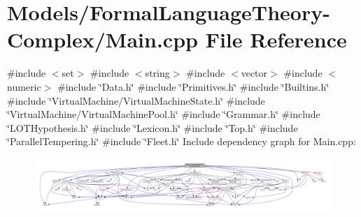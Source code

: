 \hypertarget{_formal_language_theory-_complex_2_main_8cpp}{}\section{Models/\+Formal\+Language\+Theory-\/\+Complex/\+Main.cpp File Reference}
\label{_formal_language_theory-_complex_2_main_8cpp}
{\ttfamily \#include $<$set$>$}\newline
{\ttfamily \#include $<$string$>$}\newline
{\ttfamily \#include $<$vector$>$}\newline
{\ttfamily \#include $<$numeric$>$}\newline
{\ttfamily \#include \char`\"{}Data.\+h\char`\"{}}\newline
{\ttfamily \#include \char`\"{}Primitives.\+h\char`\"{}}\newline
{\ttfamily \#include \char`\"{}Builtins.\+h\char`\"{}}\newline
{\ttfamily \#include \char`\"{}Virtual\+Machine/\+Virtual\+Machine\+State.\+h\char`\"{}}\newline
{\ttfamily \#include \char`\"{}Virtual\+Machine/\+Virtual\+Machine\+Pool.\+h\char`\"{}}\newline
{\ttfamily \#include \char`\"{}Grammar.\+h\char`\"{}}\newline
{\ttfamily \#include \char`\"{}L\+O\+T\+Hypothesis.\+h\char`\"{}}\newline
{\ttfamily \#include \char`\"{}Lexicon.\+h\char`\"{}}\newline
{\ttfamily \#include \char`\"{}Top.\+h\char`\"{}}\newline
{\ttfamily \#include \char`\"{}Parallel\+Tempering.\+h\char`\"{}}\newline
{\ttfamily \#include \char`\"{}Fleet.\+h\char`\"{}}\newline
Include dependency graph for Main.\+cpp\+:
\nopagebreak
\begin{figure}[H]
\begin{center}
\leavevmode
\includegraphics[width=350pt]{_formal_language_theory-_complex_2_main_8cpp__incl}
\end{center}
\end{figure}
